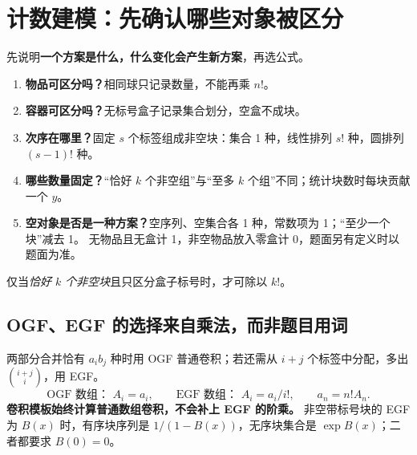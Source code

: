 \section{计数建模：先确认哪些对象被区分}\label{knowledge-counting-model}
先说明\textbf{一个方案是什么，什么变化会产生新方案}，再选公式。
\begin{enumerate}
\item \textbf{物品可区分吗？}相同球只记录数量，不能再乘 $n!$。
\item \textbf{容器可区分吗？}无标号盒子记录集合划分，空盒不成块。
\item \textbf{次序在哪里？}固定 $s$ 个标签组成非空块：集合 1 种，线性排列 $s!$ 种，圆排列 $(s-1)!$ 种。
\item \textbf{哪些数量固定？}“恰好 $k$ 个非空组”与“至多 $k$ 个组”不同；统计块数时每块贡献一个 $y$。
\item \textbf{空对象是否是一种方案？}空序列、空集合各 1 种，常数项为 1；“至少一个块”减去 1。
无物品且无盒计 1，非空物品放入零盒计 0，题面另有定义时以题面为准。
\end{enumerate}
仅当\emph{恰好 $k$ 个非空块}且只区分盒子标号时，才可除以 $k!$。

\subsection{OGF、EGF 的选择来自乘法，而非题目用词}
两部分合并恰有 $a_ib_j$ 种时用 OGF 普通卷积；若还需从 $i+j$ 个标签中分配，多出 $\binom{i+j}{i}$，用 EGF。
\[
\text{OGF 数组： }A_i=a_i,\qquad
\text{EGF 数组： }A_i=a_i/i!,\qquad a_n=n!A_n.
\]
\textbf{卷积模板始终计算普通数组卷积，不会补上 EGF 的阶乘。}
非空带标号块的 EGF 为 $B(x)$ 时，有序块序列是 $1/(1-B(x))$，无序块集合是 $\exp B(x)$；二者都要求 $B(0)=0$。

